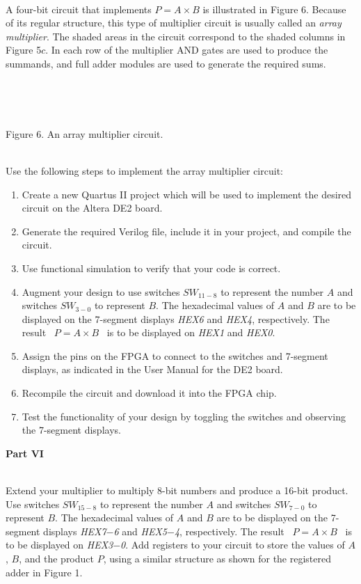 \documentclass[psfig,10pt,fullpage]{article}
\begin{document}
~\\
A four-bit circuit that implements $P = A \times B$ is illustrated in Figure 6. Because of its
regular structure, this type of multiplier circuit is usually called an {\it array
multiplier}. The shaded areas in the circuit correspond to the shaded columns in Figure
5$c$. In each row of the multiplier AND gates are used to produce the summands,
and full adder modules are used to generate the required sums.

~\\
\begin{figure}[H]
\scriptsize
\centerline{
\hbox{}}
\end{figure}
~\\
\centerline{Figure 6.  An array multiplier circuit.}
~\\

Use the following steps to implement the array multiplier circuit:

\begin{enumerate}
\item Create a new Quartus II project which will be used to implement the desired
circuit on the Altera DE2 board.
\item Generate the required Verilog file, include it in your project, 
and compile the circuit.
\item Use functional simulation to verify that your code is correct.
\item Augment your design to use switches $SW_{11-8}$ to represent the 
number $A$ and switches $SW_{3-0}$ to represent $B$. The hexadecimal values of $A$ 
and $B$ are to be displayed on the 7-segment displays {\it HEX6} and {\it HEX4}, respectively.
The result ~$P = A \times B$~ is to be displayed on {\it HEX1} and {\it HEX0}.
\item Assign the pins on the FPGA to connect to the switches and 7-segment displays,
as indicated in the User Manual for the DE2 board.
\item Recompile the circuit and download it into the FPGA chip.
\item Test the functionality of your design by toggling the switches
and observing the 7-segment displays.
\end{enumerate}

\pagebreak
\noindent
{\bf Part VI}

~\\
\noindent
Extend your multiplier to multiply 8-bit numbers and produce a 16-bit product. 
Use switches $SW_{15-8}$ to represent the number $A$ and switches $SW_{7-0}$ to 
represent $B$. The hexadecimal values of $A$ and $B$ are to be displayed on the 
7-segment displays {\it HEX7$-$6} and {\it HEX5$-$4}, respectively.
The result ~$P = A \times B$~ is to be displayed on {\it HEX3$-$0}.
Add registers to your circuit to store the values of $A$, $B$, and the product $P$, using
a similar structure as shown for the registered adder in Figure 1.
\end{document}

